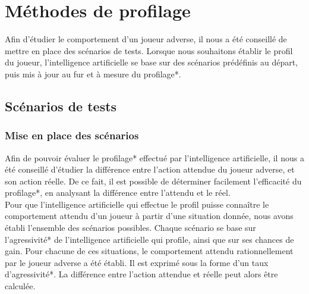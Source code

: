 \documentclass{report}
\begin{document}
\chapter{Méthodes de profilage}

\hspace{0.5cm}Afin d'étudier le comportement d'un joueur adverse, il nous a été conseillé de mettre en place des scénarios de tests. Lorsque nous souhaitons établir le profil du joueur, l'intelligence artificielle se base sur des scénarios prédéfinis au départ, puis mis à jour au fur et à mesure du profilage*.

\section{Scénarios de tests}

\subsection{Mise en place des scénarios}

\hspace{0.5cm}Afin de pouvoir évaluer le profilage* effectué par l'intelligence artificielle, il nous a été conseillé d'étudier la différence entre l'action attendue du joueur adverse, et son action réelle. De ce fait, il est possible de déterminer facilement l'efficacité du profilage*, en analysant la différence entre l'attendu et le réel.\\

Pour que l'intelligence artificielle qui effectue le profil puisse connaître le comportement attendu d'un joueur à partir d'une situation donnée, nous avons établi l'ensemble des scénarios possibles. Chaque scénario se base sur l'agressivité* de l'intelligence artificielle qui profile, ainsi que sur ses chances de gain. Pour chacune de ces situations, le comportement attendu rationnellement par le joueur adverse a été établi. Il est exprimé sous la forme d'un taux d'agressivité*. La différence entre l’action attendue et réelle peut alors être calculée.
\end{document}

